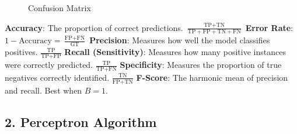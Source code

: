 \begin{figure}[h]
    \centering
    \caption{Confusion Matrix}
    \label{fig:confusion_matrix}
\end{figure}


\begin{outline}
    \1 \textbf{Accuracy}: The proportion of correct predictions. \(\frac{\text{TP} + \text{TN}}{\text{TP} + \text{FP} + \text{TN} + \text{FN}}\)
    \1 \textbf{Error Rate}: \(1 - \text{Accuracy} = \frac{\text{FP} + \text{FN}}{\text{GT}}\)
    \1 \textbf{Precision}: Measures how well the model classifies positives. \(\frac{\text{TP}}{\text{TP} + \text{FP}}\)
    \1 \textbf{Recall (Sensitivity)}: Measures how many positive instances were correctly predicted. \(\frac{\text{TP}}{\text{TP} + \text{FN}}\)
    \1 \textbf{Specificity}: Measures the proportion of true negatives correctly identified. \(\frac{\text{TN}}{\text{FP} + \text{TN}}\)
    \1 \textbf{F-Score}: The harmonic mean of precision and recall. Best when \(B = 1\).
\end{outline}

\subsection*{2. Perceptron Algorithm}

